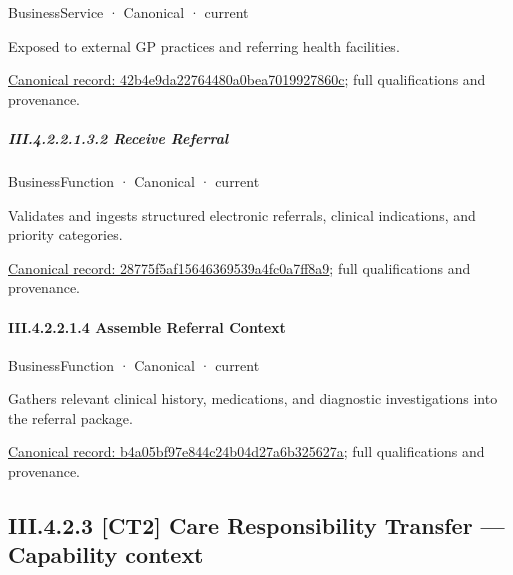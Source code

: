 \label{element:42b4e9da22764480a0bea7019927860c}
{\small BusinessService · Canonical · current}\par

Exposed to external GP practices and referring health facilities.


{\footnotesize \href{../../../../../../../../continuum/business/business-service/42b4e9da22764480a0bea7019927860c.md}{Canonical record: 42b4e9da22764480a0bea7019927860c}; full qualifications and provenance.}\par
\subparagraph*{III.4.2.2.1.3.2 Receive Referral}
\label{navigation:III.4.2.2.1.3.2}

\label{element:28775f5af15646369539a4fc0a7ff8a9}
{\small BusinessFunction · Canonical · current}\par

Validates and ingests structured electronic referrals, clinical indications, and priority categories.


{\footnotesize \href{../../../../../../../../continuum/business/business-function/28775f5af15646369539a4fc0a7ff8a9.md}{Canonical record: 28775f5af15646369539a4fc0a7ff8a9}; full qualifications and provenance.}\par
\paragraph*{III.4.2.2.1.4 Assemble Referral Context}
\label{navigation:III.4.2.2.1.4}

\label{element:b4a05bf97e844c24b04d27a6b325627a}
{\small BusinessFunction · Canonical · current}\par

Gathers relevant clinical history, medications, and diagnostic investigations into the referral package.


{\footnotesize \href{../../../../../../../../continuum/business/business-function/b4a05bf97e844c24b04d27a6b325627a.md}{Canonical record: b4a05bf97e844c24b04d27a6b325627a}; full qualifications and provenance.}\par
\subsection*{III.4.2.3 [CT2] Care Responsibility Transfer — Capability context}
\label{navigation:III.4.2.3}

